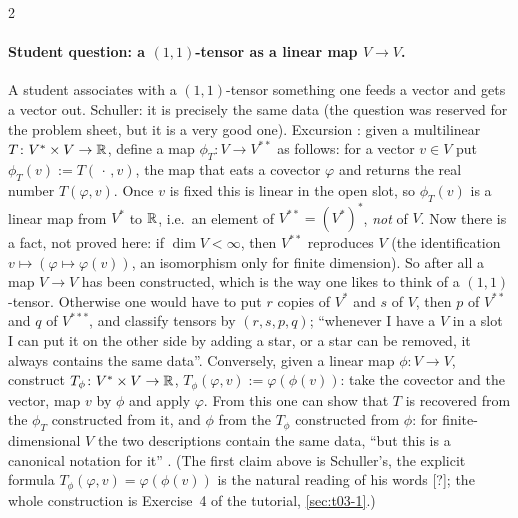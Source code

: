 \begin{paracol}{2}
\paragraph{Student question: a $(1,1)$-tensor as a linear map $V\to V$.} A student associates with a $(1,1)$-tensor something one feeds a vector and gets a vector out. Schuller: it is precisely the same data (the question was reserved for the problem sheet, but it is a very good one). Excursion
:
given a multilinear $T\colon V^*\times V\to\mathbb{R}$, define a map $\phi_T\colon V\to V^{**}$ as follows: for a vector $v\in V$ put $\phi_T(v):=T(\,\cdot\,,v)$, the map that eats a covector $\varphi$ and returns the real number $T(\varphi,v)$. Once $v$ is fixed
this is linear in the open slot, so $\phi_T(v)$ is a linear map from $V^*$ to $\mathbb{R}$, i.e.\ an element of $V^{**}=(V^*)^*$, \emph{not} of $V$.
Now there is a fact, not proved here: if $\dim V<\infty$, then $V^{**}$ reproduces $V$ (the identification $v\mapsto(\varphi\mapsto\varphi(v))$, an isomorphism only for finite dimension). So after all a map $V\to V$ has been constructed, which is the way one likes to think of a $(1,1)$-tensor.
Otherwise one would have to put $r$ copies of $V^*$ and $s$ of $V$, then $p$ of $V^{**}$ and $q$ of $V^{***}$, and classify tensors by $(r,s,p,q)$; ``whenever I have a $V$ in a slot I can put it on the other side by adding a star, or a star can be removed, it always contains the same data''.
Conversely, given a linear map $\phi\colon V\to V$, construct $T_\phi\colon V^*\times V\to\mathbb{R}$, $T_\phi(\varphi,v):=\varphi(\phi(v))$: take the covector and the vector, map $v$ by $\phi$ and apply $\varphi$.
From this one can show that $T$ is recovered from the $\phi_T$ constructed from it, and $\phi$ from the $T_\phi$ constructed from $\phi$: for finite-dimensional $V$ the two descriptions contain the same data, ``but this is a canonical notation for it''
.
(The first claim above is Schuller's, the explicit formula $T_\phi(\varphi,v)=\varphi(\phi(v))$ is the natural reading of his words [?]; the whole construction is Exercise~4 of the tutorial, \cref{sec:t03-1}.)


\end{paracol}
